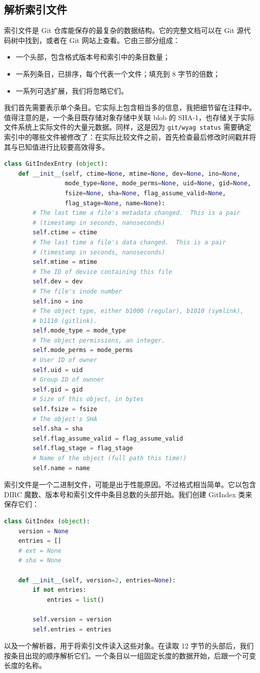 \documentclass{ctexart}
\theoremstyle{remark}
\theoremstyle{warningstyle}
\theoremstyle{warningstyle}
\begin{document}
\subsection{解析索引文件}
索引文件是 Git 仓库能保存的最复杂的数据结构。它的完整文档可以在 Git 源代码树中找到，或者在 Git 网站上查看。它由三部分组成：
\begin{itemize}
    \item 一个头部，包含格式版本号和索引中的条目数量；
    \item 一系列条目，已排序，每个代表一个文件；填充到 8 字节的倍数；
    \item 一系列可选扩展，我们将忽略它们。
\end{itemize}
我们首先需要表示单个条目。它实际上包含相当多的信息，我把细节留在注释中。值得注意的是，一个条目既存储对象存储中关联 blob 的 SHA-1，也存储关于实际文件系统上实际文件的大量元数据。同样，这是因为 \lstinline|git/wyag status| 需要确定索引中的哪些文件被修改了：在实际比较文件之前，首先检查最后修改时间戳并将其与已知值进行比较要高效得多。
\begin{lstlisting}[language=Python]
class GitIndexEntry (object):
    def __init__(self, ctime=None, mtime=None, dev=None, ino=None,
                 mode_type=None, mode_perms=None, uid=None, gid=None,
                 fsize=None, sha=None, flag_assume_valid=None,
                 flag_stage=None, name=None):
        # The last time a file's metadata changed.  This is a pair
        # (timestamp in seconds, nanoseconds)
        self.ctime = ctime
        # The last time a file's data changed.  This is a pair
        # (timestamp in seconds, nanoseconds)
        self.mtime = mtime
        # The ID of device containing this file
        self.dev = dev
        # The file's inode number
        self.ino = ino
        # The object type, either b1000 (regular), b1010 (symlink),
        # b1110 (gitlink).
        self.mode_type = mode_type
        # The object permissions, an integer.
        self.mode_perms = mode_perms
        # User ID of owner
        self.uid = uid
        # Group ID of ownner
        self.gid = gid
        # Size of this object, in bytes
        self.fsize = fsize
        # The object's SHA
        self.sha = sha
        self.flag_assume_valid = flag_assume_valid
        self.flag_stage = flag_stage
        # Name of the object (full path this time!)
        self.name = name
\end{lstlisting}
索引文件是一个二进制文件，可能是出于性能原因。不过格式相当简单。它以包含 DIRC 魔数、版本号和索引文件中条目总数的头部开始。我们创建 GitIndex 类来保存它们：
\begin{lstlisting}[language=Python]
class GitIndex (object):
    version = None
    entries = []
    # ext = None
    # sha = None

    def __init__(self, version=2, entries=None):
        if not entries:
            entries = list()

        self.version = version
        self.entries = entries
\end{lstlisting}
以及一个解析器，用于将索引文件读入这些对象。在读取 12 字节的头部后，我们按条目出现的顺序解析它们。一个条目以一组固定长度的数据开始，后跟一个可变长度的名称。
\end{document}
